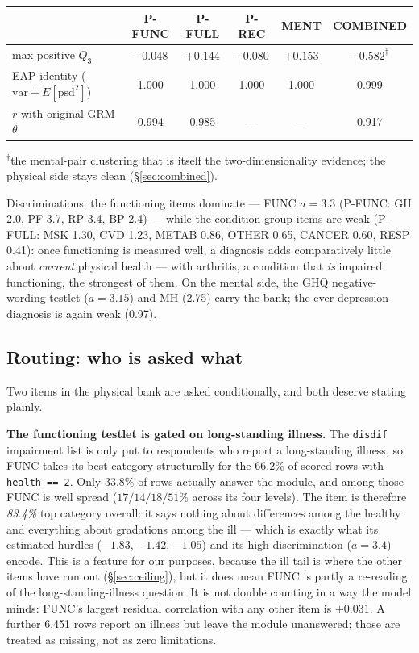 \documentclass[11pt]{article}
\newcommand{\code}[1]{\texttt{\small #1}}
\begin{document}
\begin{center}\small
\begin{tabular}{lccccc}
\toprule
 & P-FUNC & P-FULL & P-REC & MENT & COMBINED \\
\midrule
max positive $Q_3$ & $-0.048$ & $+0.144$ & $+0.080$ & $+0.153$ & $+0.582^{\dagger}$ \\
EAP identity ($\mathrm{var}+E[\mathrm{psd}^2]$) & 1.000 & 1.000 & 1.000 & 1.000 & 0.999 \\
$r$ with original GRM $\theta$ & 0.994 & 0.985 & --- & --- & 0.917 \\
\bottomrule
\end{tabular}

{\scriptsize $^{\dagger}$the mental-pair clustering that is itself the
two-dimensionality evidence; the physical side stays clean (\S\ref{sec:combined}).}
\end{center}

Discriminations: the functioning items dominate --- FUNC $a=3.3$ (P-FUNC:
GH 2.0, PF 3.7, RP 3.4, BP 2.4) --- while the condition-group items are weak
(P-FULL: MSK 1.30, CVD 1.23, METAB 0.86, OTHER 0.65, CANCER 0.60, RESP
0.41): once functioning is measured well, a diagnosis adds comparatively
little about \emph{current} physical health --- with arthritis, a condition
that \emph{is} impaired functioning, the strongest of them. On the mental side, the GHQ negative-wording testlet
($a=3.15$) and MH (2.75) carry the bank; the ever-depression diagnosis is
again weak (0.97).

\subsection{Routing: who is asked what}
\label{sec:routing}

Two items in the physical bank are asked conditionally, and both deserve
stating plainly.

\textbf{The functioning testlet is gated on long-standing illness.} The
\code{disdif} impairment list is only put to respondents who report a
long-standing illness, so FUNC takes its best category structurally for the
$66.2\%$ of scored rows with \code{health == 2}. Only $33.8\%$ of rows
actually answer the module, and among those FUNC is well spread
($17/14/18/51\%$ across its four levels). The item is therefore
\emph{83.4\%} top category overall: it says nothing about differences among
the healthy and everything about gradations among the ill --- which is
exactly what its estimated hurdles ($-1.83$, $-1.42$, $-1.05$) and its high
discrimination ($a = 3.4$) encode. This is a feature for our purposes,
because the ill tail is where the other items have run out
(\S\ref{sec:ceiling}), but it does mean FUNC is partly a re-reading of the
long-standing-illness question. It is not double counting in a way the model
minds: FUNC's largest residual correlation with any other item is $+0.031$.
A further 6{,}451 rows report an illness but leave the module unanswered;
those are treated as missing, not as zero limitations.
\end{document}
